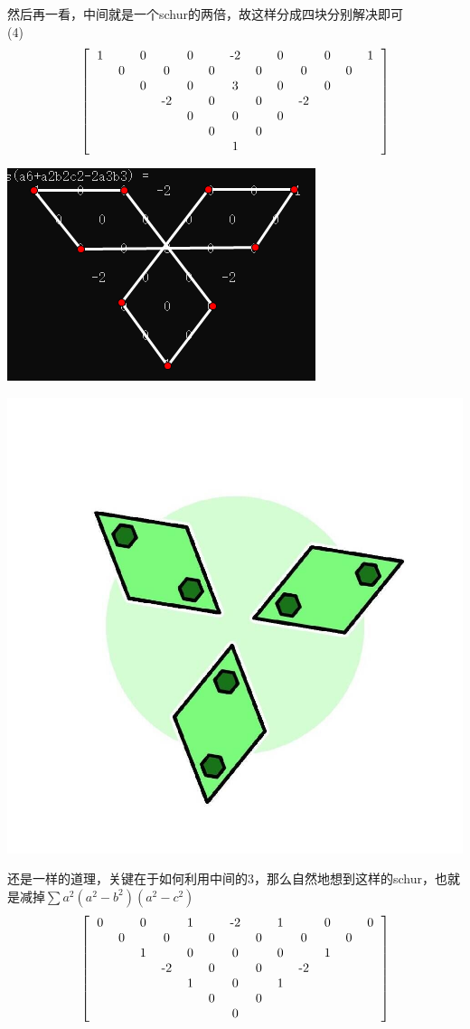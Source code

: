 \documentclass[UTF8]{ctexart}
\begin{document}
然后再一看，中间就是一个schur的两倍，故这样分成四块分别解决即可\\
(4)\renewcommand*{\arraystretch}{1.732}\[\left[\begin{matrix}
	\begin{tabular}{ccccccccccccc}
		1& &0& &0& &-2& &0& &0& &1\\
		&0& &0& &0& &0& &0& &0&\\
		& &0& &0& &3& &0& &0& &\\
		& & &-2& &0& &0& &-2& & &\\
		& & & &0& &0& &0& & & &\\
		& & & & &0& &0& & & & &\\
		& & & & & &1& & & & & &\\
	\end{tabular}
\end{matrix}\right]\]
\begin{center}
	\includegraphics[width=0.5\linewidth]{230}
\end{center}
\begin{center}
	\includegraphics[width=0.4\linewidth]{210}
\end{center}
还是一样的道理，关键在于如何利用中间的3，那么自然地想到这样的schur，也就是减掉$ \displaystyle  \sum a^{2}(a^{2}-b^{2})(a^{2}-c^{2}) $
\renewcommand*{\arraystretch}{1.732}\[\left[\begin{matrix}
	\begin{tabular}{ccccccccccccc}
		0& &0& &1& &-2& &1& &0& &0\\
		&0& &0& &0& &0& &0& &0&\\
		& &1& &0& &0& &0& &1& &\\
		& & &-2& &0& &0& &-2& & &\\
		& & & &1& &0& &1& & & &\\
		& & & & &0& &0& & & & &\\
		& & & & & &0& & & & & &\\
	\end{tabular}
\end{matrix}\right]\]
\end{document}
